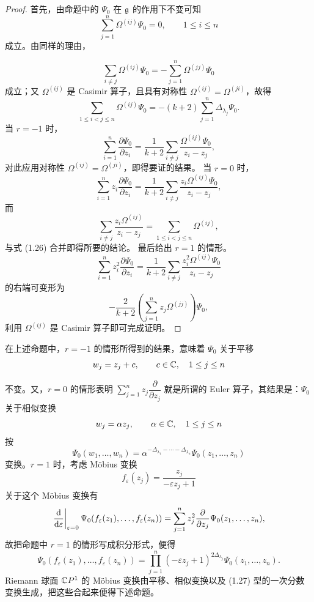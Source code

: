 \begin{proof}
  首先，由命题中的 $\Psi_0$ 在 $\mathfrak{g}$ 的作用下不变可知
  \[
  \sum_{j=1}^{n}\Omega^{(ij)}\Psi_0=0,\qquad 1\le i\le n
  \]
  成立。由同样的理由，


  \[
  \sum_{i\ne j}\Omega^{(ij)}\Psi_0=-\sum_{j=1}^{n}\Omega^{(jj)}\Psi_0
  \]
  成立；又 $\Omega^{(ij)}$ 是 Casimir 算子，且具有对称性 $\Omega^{(ij)}=\Omega^{(ji)}$，故得
  \begin{equation}
    \sum_{1\le i<j\le n}\Omega^{(ij)}\Psi_0=-(k+2)\sum_{j=1}^{n}\Delta_{\lambda_j}\Psi_0 . \tag{1.26}
  \end{equation}
  当 $r=-1$ 时，
  \[
  \sum_{i=1}^{n}\frac{\partial\Psi_0}{\partial z_i}
  =\frac{1}{k+2}\sum_{i\ne j}\frac{\Omega^{(ij)}\Psi_0}{z_i-z_j},
  \]
  对此应用对称性 $\Omega^{(ij)}=\Omega^{(ji)}$，即得要证的结果。
  当 $r=0$ 时，
  \[
  \sum_{i=1}^{n}z_i\frac{\partial\Psi_0}{\partial z_i}
  =\frac{1}{k+2}\sum_{i\ne j}\frac{z_i\Omega^{(ij)}\Psi_0}{z_i-z_j},
  \]
  而
  \[
  \sum_{i\ne j}\frac{z_i\Omega^{(ij)}}{z_i-z_j}
  =\sum_{1\le i<j\le n}\Omega^{(ij)} ,
  \]
  与式 (1.26) 合并即得所要的结论。
  最后给出 $r=1$ 的情形。
  \[
  \sum_{i=1}^{n}z_i^{2}\frac{\partial\Psi_0}{\partial z_i}
  =\frac{1}{k+2}\sum_{i\ne j}\frac{z_i^{2}\Omega^{(ij)}\Psi_0}{z_i-z_j}
  \]
  的右端可变形为
  \[
  -\frac{2}{k+2}\left(\sum_{j=1}^{n}z_j\Omega^{(jj)}\right)\Psi_0 ,
  \]
  利用 $\Omega^{(ij)}$ 是 Casimir 算子即可完成证明。
\end{proof}

在上述命题中，$r=-1$ 的情形所得到的结果，意味着 $\Psi_0$ 关于平移
\[
w_j=z_j+c,\qquad c\in\mathbb{C},\quad 1\le j\le n
\]


不变。又，$r=0$ 的情形表明 $\sum_{j=1}^{n}z_j\dfrac{\partial}{\partial z_j}$ 就是所谓的 Euler 算子，其结果是：$\Psi_0$ 关于相似变换
\[
w_j=\alpha z_j,\qquad \alpha\in\mathbb{C},\quad 1\le j\le n
\]
按
\[
\Psi_0(w_1,\dots,w_n)=\alpha^{-\Delta_{\lambda_1}-\cdots-\Delta_{\lambda_n}}\Psi_0(z_1,\dots,z_n)
\]
变换。$r=1$ 时，考虑 Möbius 变换
\begin{equation}
  f_\varepsilon(z_j)=\frac{z_j}{-\varepsilon z_j+1} \tag{1.27}
\end{equation}
关于这个 Möbius 变换有
\[
\left.\frac{\mathrm{d}}{\mathrm{d}\varepsilon}\right|_{\varepsilon=0}\Psi_0(f_\varepsilon(z_1),\dots,f_\varepsilon(z_n))
=\sum_{j=1}^{n}z_j^{2}\frac{\partial}{\partial z_j}\Psi_0(z_1,\dots,z_n),
\]
故把命题中 $r=1$ 的情形写成积分形式，便得
\[
\Psi_0(f_\varepsilon(z_1),\dots,f_\varepsilon(z_n))
=\prod_{j=1}^{n}(-\varepsilon z_j+1)^{2\Delta_{\lambda_j}}\Psi_0(z_1,\dots,z_n).
\]
Riemann 球面 $\mathbb{C}P^1$ 的 Möbius 变换由平移、相似变换以及 (1.27) 型的一次分数变换生成，把这些合起来便得下述命题。

